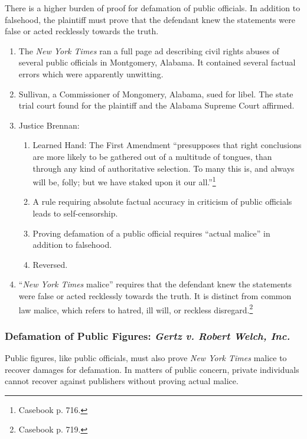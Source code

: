 There is a higher burden of proof for defamation of public officials. In 
addition to falsehood, the plaintiff must prove that the defendant knew the 
statements were false or acted recklessly towards the truth.

\begin{enumerate}
    \item The \emph{New York Times} ran a full page ad describing civil rights 
    abuses of several public officials in Montgomery, Alabama. It contained 
    several factual errors which were apparently unwitting.
    \item Sullivan, a Commissioner of Mongomery, Alabama, sued for libel. The 
    state trial court found for the plaintiff and the Alabama Supreme Court 
    affirmed.
    \item Justice Brennan:
    \begin{enumerate}
        \item Learned Hand: The First Amendment ``presupposes that right conclusions are 
        more likely to be gathered out of a multitude of tongues, than through 
        any kind of authoritative selection. To many this is, and always will 
        be, folly; but we have staked upon it our all.''\footnote{Casebook p. 
        716.}
        \item A rule requiring absolute factual accuracy in criticism of 
        public officials leads to self-censorship.
        \item Proving defamation of a public official requires ``actual 
        malice'' in addition to falsehood.
        \item Reversed.
    \end{enumerate}
    \item ``\emph{New York Times} malice'' requires that the defendant knew 
    the statements were false or acted recklessly towards the truth. It is 
    distinct from common law malice, which refers to hatred, ill will, or 
    reckless disregard.\footnote{Casebook p. 719.}
\end{enumerate}

\subsubsection{Defamation of Public Figures: \emph{Gertz v. Robert Welch, Inc.}}

Public figures, like public officials, must also prove \emph{New York Times} 
malice to recover damages for defamation. In matters of public concern, 
private individuals cannot recover against publishers without proving actual 
malice.

